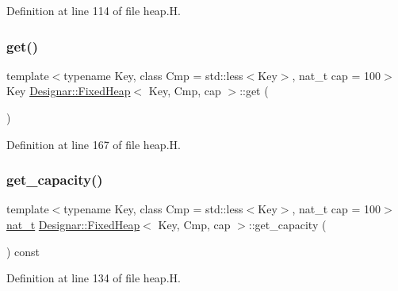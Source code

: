 Definition at line 114 of file heap.\+H.

\mbox{\label{class_designar_1_1_fixed_heap_a0a274fa702d084e555b917b04ee73b37}} 
\subsubsection{\texorpdfstring{get()}{get()}}
{\footnotesize\ttfamily template$<$typename Key, class Cmp = std\+::less$<$\+Key$>$, nat\+\_\+t cap = 100$>$ \\
Key \hyperlink{class_designar_1_1_fixed_heap}{Designar\+::\+Fixed\+Heap}$<$ Key, Cmp, cap $>$\+::get (\begin{DoxyParamCaption}{ }\end{DoxyParamCaption})\hspace{0.3cm}{\ttfamily [inline]}}



Definition at line 167 of file heap.\+H.

\mbox{\label{class_designar_1_1_fixed_heap_a6f2b6bb5de9abd4718f07eb1261bee92}} 
\subsubsection{\texorpdfstring{get\+\_\+capacity()}{get\_capacity()}}
{\footnotesize\ttfamily template$<$typename Key, class Cmp = std\+::less$<$\+Key$>$, nat\+\_\+t cap = 100$>$ \\
\hyperlink{namespace_designar_aa72662848b9f4815e7bf31a7cf3e33d1}{nat\+\_\+t} \hyperlink{class_designar_1_1_fixed_heap}{Designar\+::\+Fixed\+Heap}$<$ Key, Cmp, cap $>$\+::get\+\_\+capacity (\begin{DoxyParamCaption}{ }\end{DoxyParamCaption}) const\hspace{0.3cm}{\ttfamily [inline]}}



Definition at line 134 of file heap.\+H.

\mbox{\label{class_designar_1_1_fixed_heap_a29db925edd7d26a8cd6f8ee970e70b53}} 
